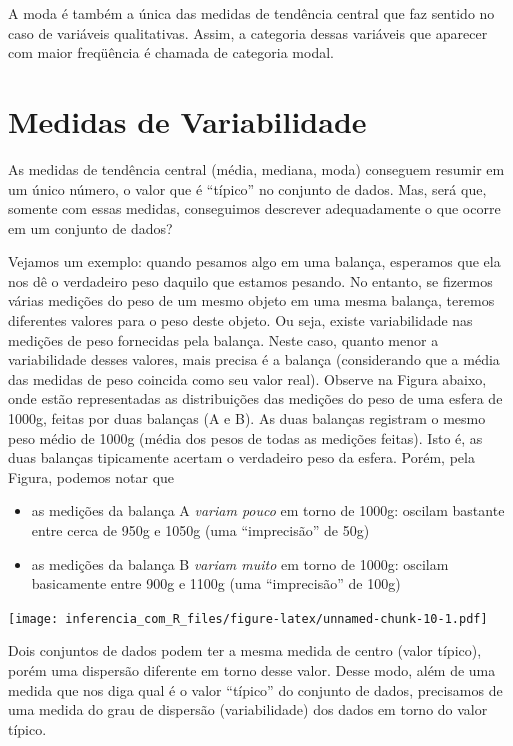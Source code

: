 \documentclass[
]{book}
\providecommand{\tightlist}{%
  \setlength{\itemsep}{0pt}\setlength{\parskip}{0pt}}
\begin{document}
A moda é também a única das medidas de tendência central que faz sentido no caso de variáveis qualitativas. Assim, a categoria dessas variáveis que aparecer com maior freqüência é chamada de categoria modal.

\hypertarget{medidas-de-variabilidade}{%
\section{Medidas de Variabilidade}\label{medidas-de-variabilidade}}

As medidas de tendência central (média, mediana, moda) conseguem resumir em um único número, o valor que é ``típico'' no conjunto de dados. Mas, será que, somente com essas medidas, conseguimos descrever adequadamente o que ocorre em um conjunto de dados?

Vejamos um exemplo: quando pesamos algo em uma balança, esperamos que ela nos dê o verdadeiro peso daquilo que estamos pesando. No entanto, se fizermos várias medições do peso de um mesmo objeto em uma mesma balança, teremos diferentes valores para o peso deste objeto. Ou seja, existe variabilidade nas medições de peso fornecidas pela balança. Neste caso, quanto menor a variabilidade desses valores, mais precisa é a balança (considerando que a média das medidas de peso coincida como seu valor real). Observe na Figura abaixo, onde estão representadas as distribuições das medições do peso de uma esfera de 1000g, feitas por duas balanças (A e B). As duas balanças registram o mesmo peso médio de 1000g (média dos pesos de todas as medições feitas). Isto é, as duas balanças tipicamente acertam o verdadeiro peso da esfera. Porém, pela Figura, podemos notar que

\begin{itemize}
\tightlist
\item
  as medições da balança A \emph{variam pouco} em torno de 1000g: oscilam bastante entre cerca de 950g e 1050g (uma ``imprecisão'' de 50g)
\item
  as medições da balança B \emph{variam muito} em torno de 1000g: oscilam basicamente entre 900g e 1100g (uma ``imprecisão'' de 100g)
\end{itemize}

\texttt{[image: inferencia\_com\_R\_files/figure-latex/unnamed-chunk-10-1.pdf]}

Dois conjuntos de dados podem ter a mesma medida de centro (valor típico), porém uma dispersão diferente em torno desse valor. Desse modo, além de uma medida que nos diga qual é o valor ``típico'' do conjunto de dados, precisamos de uma medida do grau de dispersão (variabilidade) dos dados em torno do valor típico.
\end{document}
